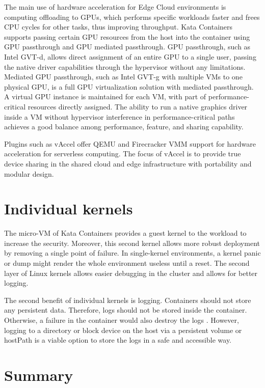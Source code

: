The main use of hardware acceleration for Edge Cloud environments is computing offloading to GPUs, which performs specific workloads faster and frees CPU cycles for other tasks, thus improving throughput. Kata Containers supports passing certain GPU resources from the host into the container using GPU passthrough and GPU mediated passthrough. GPU passthrough, such as Intel GVT-d, allows direct assignment of an entire GPU to a single user, passing the native driver capabilities through the hypervisor without any limitations. Mediated GPU passthrough, such as Intel GVT-g with multiple VMs to one physical GPU, is a full GPU virtualization solution with mediated passthrough. A virtual GPU instance is maintained for each VM, with part of performance-critical resources directly assigned. The ability to run a native graphics driver inside a VM without hypervisor interference in performance-critical paths achieves a good balance among performance, feature, and sharing capability. \cite{GPUKataContainers}

Plugins such as vAccel \cite{vAccel} offer QEMU and Firecracker VMM support for hardware acceleration for serverless computing. The focus of vAccel is to provide true device sharing in the shared cloud and edge infrastructure with portability and modular design.
		
\section{Individual kernels}

The micro-VM of Kata Containers provides a guest kernel to the workload to increase the security. Moreover, this second kernel allows more robust deployment by removing a single point of failure. In single-kernel environments, a kernel panic or dump might render the whole environment useless until a reset. The second layer of Linux kernels allows easier debugging in the cluster and allows for better logging.

The second benefit of individual kernels is logging. Containers should not store any persistent data. Therefore, logs should not be stored inside the container. Otherwise, a failure in the container would also destroy the logs \cite{Toimela2017}. However, logging to a directory or block device on the host via a persistent volume or hostPath is a viable option to store the logs in a safe and accessible way.

\section{Summary}

